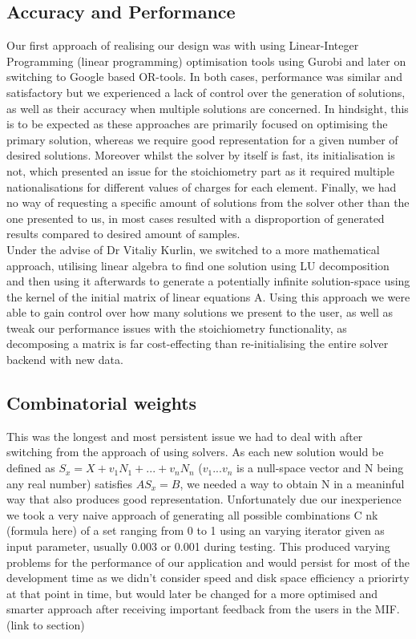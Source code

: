 \subsection*{Accuracy and Performance}
Our first approach of realising our design was with using Linear-Integer Programming (linear programming) optimisation tools using Gurobi and later on switching to Google based OR-tools. In both cases, performance was similar and satisfactory but we experienced a lack of control over the generation of solutions, as well as their accuracy when multiple solutions are concerned. In hindsight, this is to be expected as these approaches are primarily focused on optimising the primary solution, whereas we require good representation for a given number of desired solutions. Moreover whilst the solver by itself is fast, its initialisation is not, which presented an issue for the stoichiometry part as it required multiple nationalisations for different values of charges for each element. Finally, we had no way of requesting a specific amount of solutions from the solver other than the one presented to us, in most cases resulted with a disproportion of generated results compared to desired amount of samples. \\

Under the advise of Dr Vitaliy Kurlin, we switched to a more mathematical approach, utilising linear algebra to find one solution using LU decomposition and then using it afterwards to generate a potentially infinite solution-space using the kernel of the initial matrix of linear equations A. Using this approach we were able to gain control over how many solutions we present to the user, as well as tweak our performance issues with the stoichiometry functionality, as decomposing a matrix is far cost-effecting than re-initialising the entire solver backend with new data. \\

\subsection*{Combinatorial weights}
This was the longest and most persistent issue we had to deal with after switching from the approach of using solvers. As each new solution would be defined as $S_{x} = X + v_{1}N_{1} + ... + v_{n}N_{n}$ ($v_{1} ... v_{n}$ is a null-space vector and N being any real number) satisfies $AS_{x} = B$, we needed a way to obtain N in a meaninful way that also produces good representation. Unfortunately due our inexperience we took a very naive approach of generating all possible combinations C nk (formula here) of a set ranging from 0 to 1 using an varying iterator given as input parameter, usually 0.003 or 0.001 during testing. This produced varying problems for the performance of our application and would persist for most of the development time as we didn't consider speed and disk space efficiency a priorirty at that point in time, but would later be changed for a more optimised and smarter approach after receiving important feedback from the users in the MIF. (link to section) \\

